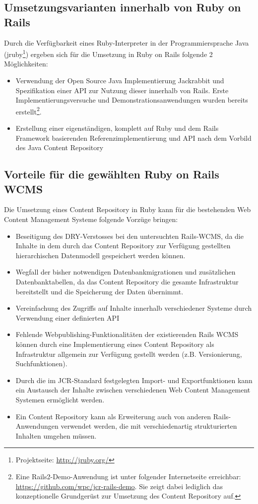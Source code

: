 \subsection{Umsetzungsvarianten innerhalb von Ruby on Rails}

Durch die Verfügbarkeit eines Ruby-Interpreter in der Programmiersprache Java (jruby\footnote{Projektseite: \href{http://jruby.org/}{http://jruby.org/}}) ergeben sich für die Umsetzung in Ruby on Rails folgende 2 Möglichkeiten:

\begin{itemize}
\item
Verwendung der Open Source Java Implementierung Jackrabbit und Spezifikation einer API zur Nutzung dieser innerhalb von Rails. Erste Implementierungsversuche und Demonstrationsanwendungen wurden bereits erstellt\footnote{Eine Rails2-Demo-Anwendung ist unter folgender Internetseite erreichbar: \href{https://github.com/wpc/jcr-rails-demo}{https://github.com/wpc/jcr-rails-demo}. Sie zeigt dabei lediglich das konzeptionelle Grundgerüst zur Umsetzung des Content Repository auf.}.
\item
Erstellung einer eigenständigen, komplett auf Ruby und dem Rails Framework basierenden Referenzimplementierung und API nach dem Vorbild des Java Content Repository
\end{itemize}


\subsection{Vorteile für die gewählten Ruby on Rails WCMS}

Die Umsetzung eines Content Repository in Ruby kann für die bestehenden Web Content Management Systeme folgende Vorzüge bringen:

\begin{itemize}
\item Beseitigung des DRY-Verstosses bei den untersuchten Rails-WCMS, da die Inhalte in dem durch das Content Repository zur Verfügung gestellten hierarchischen Datenmodell gespeichert werden können.
\item
Wegfall der bisher notwendigen Datenbankmigrationen und zusätzlichen Datenbanktabellen, da das Content Repository die gesamte Infrastruktur bereitstellt und die Speicherung der Daten übernimmt.
\item Vereinfachung des Zugriffs auf Inhalte innerhalb verschiedener Systeme durch Verwendung einer definierten API
\item Fehlende Webpublishing-Funktionalitäten der existierenden Rails WCMS können durch eine Implementierung eines Content Repository als Infrastruktur allgemein zur Verfügung gestellt werden (z.B. Versionierung, Suchfunktionen).
\item Durch die im JCR-Standard festgelegten Import- und Exportfunktionen kann ein Austausch der Inhalte zwischen verschiedenen Web Content Management Systemen ermöglicht werden.
\item Ein Content Repository kann als Erweiterung auch von anderen Rails-Anwendungen verwendet werden, die mit verschiedenartig strukturierten Inhalten umgehen müssen.
\end{itemize}



